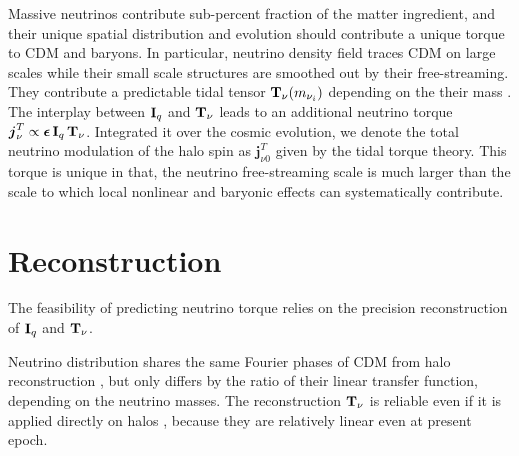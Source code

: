 \documentclass[aps,prd,twocolumn,amsmath,amssymb,amsfont,superscriptaddress,nofootinbib]{revtex4-1}
\newcommand{\bs}{\boldsymbol}
\newcommand{\diff}{{\mathrm d}}
\newcommand{\T}{\bold{T}}
\newcommand{\I}{\bold{I}}
\newcommand{\spin}{\bs{j}}
\begin{document}
Massive neutrinos contribute sub-percent fraction of the matter ingredient, and their unique spatial distribution and evolution should contribute a unique torque to CDM and baryons.
In particular, neutrino density field traces CDM on large scales while their small scale structures are smoothed out by their free-streaming. 
They contribute a predictable tidal tensor $\T_\nu(m_{\nu_i})$ depending on the their mass \citep{2015PhRvD..92b3502I}. 
The interplay between $\I_q$ and $\T_\nu$ leads to an additional neutrino torque $\spin^T_\nu\propto\bs{\epsilon}\,\I_q\,\T_\nu$.
Integrated it over the cosmic evolution, we denote the total neutrino modulation of the halo spin as $\spin^T_{\nu 0}$ given by the tidal torque theory.
This torque is unique in that, the neutrino free-streaming scale is much larger than the scale to which local nonlinear and baryonic effects can systematically contribute.


\section{Reconstruction}\label{sec.reco}
The feasibility of predicting neutrino torque relies on the precision reconstruction of $\I_q$ and $\T_\nu$.

Neutrino distribution shares the same Fourier phases of CDM from halo reconstruction \citep{2015PhRvD..92b3502I,2017ApJ...847..110Y}, but only differs by the ratio of their linear transfer function, depending on the neutrino masses. The reconstruction $\T_\nu$ is reliable even if it is applied directly on halos \citep{2015PhRvD..92b3502I}, because they are relatively linear even at present epoch.
\end{document}
